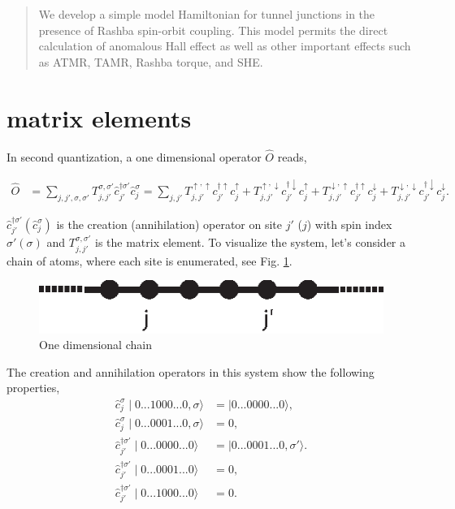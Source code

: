 \documentclass[10pt,prb,showpacs,amssymb,floatfix]{revtex4-1}
\begin{document}
\date{\today}

\begin{abstract}
We develop a simple model Hamiltonian for tunnel junctions in the presence of Rashba spin-orbit coupling. This model permits the direct calculation of anomalous Hall effect as well as other important effects such as ATMR, TAMR, Rashba torque, and SHE.
\end{abstract}
\maketitle


\section{matrix elements}
In second quantization, a one dimensional operator $\hat O$ reads,

\begin{align}
\label{eq1}
\hat{O} &= \sum_{j,j',\sigma,\sigma'} T_{j,j'}^{\sigma,\sigma'} \hat{c}_{j'}^{\dagger \sigma'} \hat{c}^\sigma_j =  \sum_{j,j'} T_{j,j'}^{\uparrow,\uparrow} c_{j'}^{\dagger \uparrow} c_j^\uparrow + T_{j,j'}^{\uparrow,\downarrow} c_{j'}^{\dagger \downarrow} c_j^\uparrow + T_{j,j'}^{\downarrow,\uparrow} c_{j'}^{\dagger \uparrow} c_j^\downarrow + T_{j,j'}^{\downarrow,\downarrow} c_{j'}^{\dagger \downarrow} c_j^\downarrow.
\end{align}
       
           
              
$\hat{c}_{j'}^{\dagger \sigma'} (\hat{c}^\sigma_j)$ is the creation (annihilation) operator on site $j'$ ($j$) with spin index  $\sigma'(\sigma)$ and $T_{j,j'}^{\sigma,\sigma'}$ is the matrix element. To visualize the system, let's consider a chain of atoms, where each site is enumerated, see Fig. \ref{1d}. 

\begin{figure}[ht]
\centering
\includegraphics{fig1.eps}
\caption{One dimensional chain}
\label{1d}
\end{figure}

The creation and annihilation operators in this system show the following properties,
\begin{align}
\label{pro1}
\hat{c}^\sigma_j \mid 0...1 0 0 0...0 , \sigma \rangle &=  \mid 0...0 0 0 0...0 \rangle, \\
\label{pro2}
\hat{c}^\sigma_j \mid 0...0 0 0 1...0 , \sigma \rangle &=  0,\\
\label{pro3}
\hat{c}_{j'}^{\dagger \sigma'} \mid 0...0 0 0 0...0\rangle &=  \mid 0...0 0 0 1...0, \sigma' \rangle.\\
\label{pro4}
\hat{c}_{j'}^{\dagger \sigma'} \mid 0...0 0 0 1...0\rangle &=  0, \\
\hat{c}_{j'}^{\dagger \sigma'} \mid 0...1 0 0 0...0\rangle &=  0.
\label{pro5}
\end{align}
\end{document}

